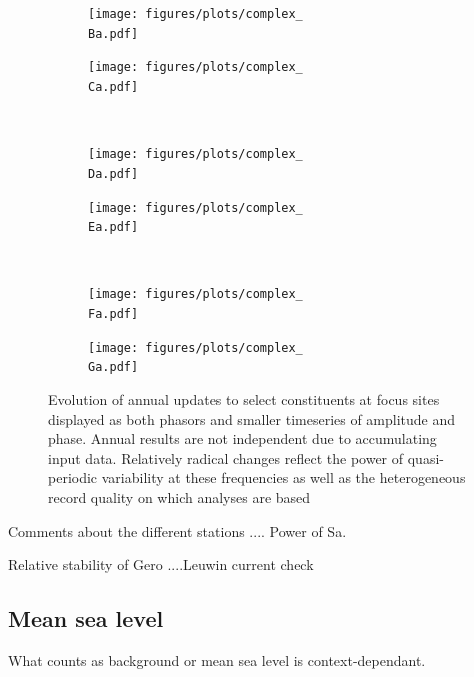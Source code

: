 \begin{figure}[H]\centering
    \begin{subfigure}[b]{\figwidthHalf}
        \texttt{[image: figures/plots/complex\_\\Ba.pdf]}\caption{\Bname{}}
    \end{subfigure}
    \begin{subfigure}[b]{\figwidthHalf}
        \texttt{[image: figures/plots/complex\_\\Ca.pdf]}\caption{\Cname{}}
    \end{subfigure} 
    \\
    \begin{subfigure}[b]{\figwidthHalf}
        \texttt{[image: figures/plots/complex\_\\Da.pdf]}\caption{\Dname{}}
    \end{subfigure}
    \begin{subfigure}[b]{\figwidthHalf}
        \texttt{[image: figures/plots/complex\_\\Ea.pdf]}\caption{\Ename{}}
    \end{subfigure}
    \\
    \begin{subfigure}[b]{\figwidthHalf}
        \texttt{[image: figures/plots/complex\_\\Fa.pdf]} \caption{\Fname{}}
    \end{subfigure}
    \begin{subfigure}[b]{\figwidthHalf}
        \texttt{[image: figures/plots/complex\_\\Ga.pdf]} \caption{\Gname{}}
    \end{subfigure}
    \caption{Evolution of annual updates to select constituents at focus sites displayed as both phasors and smaller timeseries of amplitude and phase.  Annual results are not independent due to accumulating input data. Relatively radical changes reflect the power of quasi-periodic variability at these frequencies as well as the heterogeneous record quality on which analyses are based} 
    \label{fig:complexEvolution}
\end{figure}   


Comments about the different stations ....
Power of Sa.


Relative stability of Gero ....Leuwin current check



\subsection{Mean sea level}
\label{Sec:MSL}
What counts as background or mean sea level is context-dependant. 

